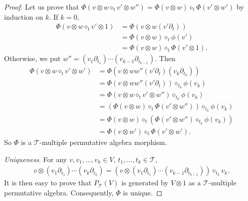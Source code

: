\documentclass[10pt,a4paper]{amsart}
\numberwithin{equation}{section}
\newcommand{\T}{\mathcal{T}}
\begin{document}
\begin{proof}
Let us prove that $\Phi(v\otimes w \diamond_t v'\otimes w'')=\Phi(v\otimes w)\diamond_t \Phi(v'\otimes w')$
by induction on $k$. If $k=0$,
\begin{align*}
\Phi(v\otimes w \diamond_t v'\otimes 1)&=\Phi(v\otimes w(v'\partial_t))\\[.5ex]
&=\Phi(v\otimes w)\diamond_t \phi(v')\\[.5ex]
&=\Phi(v\otimes w)\diamond_t \Phi(v'\otimes 1).
\end{align*}
Otherwise, we put $w''=(v_1\partial_{t_1})\cdots (v_{k-1}\partial_{t_{k-1}})$. Then
\begin{align*}
\Phi(v\otimes w \diamond_t v'\otimes w')&=\Phi(v\otimes ww'' (v'\partial_t)(v_k \partial_{t_k}))\\[.5ex]
&=\Phi(v\otimes ww'' (v'\partial_t))\diamond_{t_k} \phi(v_k)\\[.5ex]
&=\Phi(v\otimes w \diamond_t v'\otimes w'')\diamond_{t_k} \phi(v_k)\\[.5ex]
&=(\Phi(v\otimes w)\diamond_t \Phi(v'\otimes w''))\diamond_{t_k} \phi(v_k)\\[.5ex]
&=\Phi(v\otimes w)\diamond_t (\Phi(v'\otimes w'')\diamond_{t_k} \phi(v_k))\\[.5ex]
&=\Phi(v\otimes w')\diamond_t \Phi(v'\otimes w').
\end{align*}
So $\Phi$ is a $\T$-multiple permutative algebra morphism.

\textit{Uniqueness}. For any $v,v_1,\dots,v_k \in V$, $t_1,\dots,t_k \in \T$,
\begin{gather*}
v\otimes (v_1\partial_{t_1})\cdots (v_k\partial_{t_k})
=(v\otimes (v_1\partial_{t_1})\cdots (v_{k-1}\partial_{t_{k-1}}))\diamond_{t_k} v_k.
\end{gather*}
It is then easy to prove that $P_\T(V)$ is generated by $V\otimes 1$ as a $\T$-multiple permutative algebra.
Consequently, $\Phi$ is unique. \end{proof}
\end{document}
